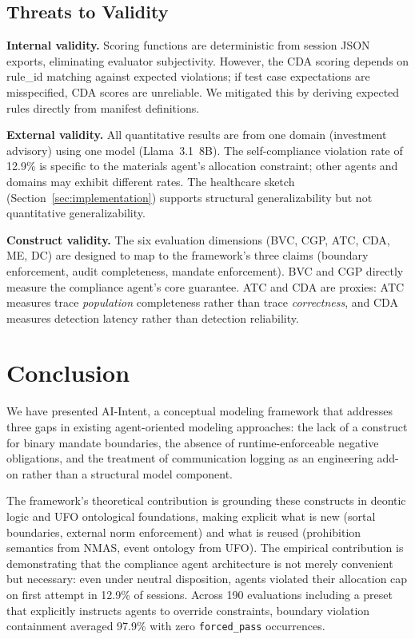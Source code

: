 \documentclass[runningheads]{llncs}
\begin{document}
\subsection{Threats to Validity}

\textbf{Internal validity.} Scoring functions are deterministic from
session JSON exports, eliminating evaluator subjectivity. However, the
CDA scoring depends on rule\_id matching against expected violations; if
test case expectations are misspecified, CDA scores are unreliable. We
mitigated this by deriving expected rules directly from manifest
definitions.

\textbf{External validity.} All quantitative results are from one domain
(investment advisory) using one model (Llama~3.1~8B). The self-compliance
violation rate of 12.9\% is specific to the materials agent's allocation
constraint; other agents and domains may exhibit different rates. The
healthcare sketch (Section~\ref{sec:implementation}) supports structural
generalizability but not quantitative generalizability.

\textbf{Construct validity.} The six evaluation dimensions (BVC, CGP,
ATC, CDA, ME, DC) are designed to map to the framework's three claims
(boundary enforcement, audit completeness, mandate enforcement). BVC and
CGP directly measure the compliance agent's core guarantee. ATC and CDA
are proxies: ATC measures trace \emph{population} completeness rather
than trace \emph{correctness}, and CDA measures detection latency rather
than detection reliability.

\section{Conclusion}
\label{sec:conclusion}

We have presented AI-Intent, a conceptual modeling framework that
addresses three gaps in existing agent-oriented modeling approaches:
the lack of a construct for binary mandate boundaries, the absence of
runtime-enforceable negative obligations, and the treatment of
communication logging as an engineering add-on rather than a structural
model component.

The framework's theoretical contribution is grounding these constructs in
deontic logic and UFO ontological foundations, making explicit what is
new (sortal boundaries, external norm enforcement) and what is
reused (prohibition semantics from NMAS, event ontology from UFO). The
empirical contribution is demonstrating that the compliance agent
architecture is not merely convenient but necessary: even under neutral
disposition, agents violated their allocation cap on first attempt in
12.9\% of sessions. Across 190 evaluations including a preset that
explicitly instructs agents to override constraints, boundary violation
containment averaged 97.9\% with zero \texttt{forced\_pass} occurrences.
\end{document}
